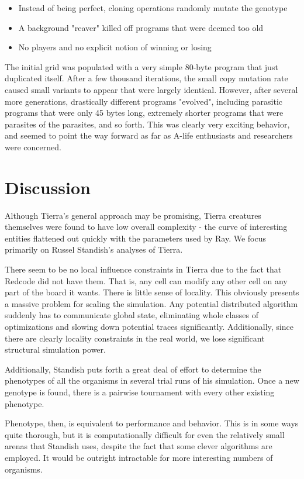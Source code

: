 \documentclass[11pt, twocolumn]{article}
\begin{document}
\begin{itemize}
\item Instead of being perfect, cloning operations randomly mutate the genotype
\item A background "reaver" killed off programs that were deemed too old
\item No players and no explicit notion of winning or losing
\end{itemize}

The initial grid was populated with a very simple 80-byte program that just duplicated itself. After a few thousand iterations, the small copy mutation rate caused small variants to appear that were largely identical.
However, after several more generations, drastically different programs "evolved", including parasitic programs that were only 45 bytes long, extremely shorter programs that were parasites of the parasites, and so forth. This was clearly very exciting behavior, and seemed to point the way forward as far as A-life enthusiasts and researchers were concerned.

\section{Discussion}
Although Tierra's general approach may be promising, Tierra creatures themselves were found to have low overall complexity - the curve of interesting entities flattened out quickly with the parameters used by Ray.  We focus primarily on Russel Standish's analyses of Tierra.

There seem to be no local influence constraints in Tierra due to the fact that Redcode did not have them. That is, any cell can modify any other cell on any part of the board it wants. There is little sense of locality. This obviously presents a massive problem for scaling the simulation. Any potential distributed algorithm suddenly has to communicate global state, eliminating whole classes of optimizations and slowing down potential traces significantly. Additionally, since there are clearly locality constraints in the real world, we lose significant structural simulation power.

Additionally, Standish puts forth a great deal of effort to determine the phenotypes of all the organisms in several trial runs of his simulation. Once a new genotype is found, there is a pairwise tournament with every other existing phenotype.

Phenotype, then, is equivalent to performance and behavior. This is in some ways quite thorough, but it is computationally difficult for even the relatively small arenas that Standish uses, despite the fact that some clever algorithms are employed. It would be outright intractable for more interesting numbers of organisms.
\end{document}
